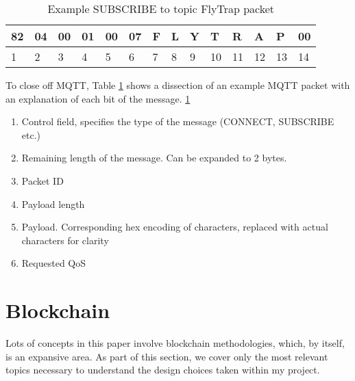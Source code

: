 \begin{table}[h]
\centering
\begin{tabular}{llllllllllllll}
\hline
\multicolumn{1}{|l|}{82} & \multicolumn{1}{l|}{04} & \multicolumn{1}{l|}{00} & \multicolumn{1}{l|}{01} & \multicolumn{1}{l|}{00} & \multicolumn{1}{l|}{07} & \multicolumn{1}{l|}{F} & \multicolumn{1}{l|}{L} & \multicolumn{1}{l|}{Y} & \multicolumn{1}{l|}{T} & \multicolumn{1}{l|}{R} & \multicolumn{1}{l|}{A} & \multicolumn{1}{l|}{P} & \multicolumn{1}{l|}{00} \\ \hline
1                        & 2                       & 3                       & 4                       & 5                       & 6                       & 7                      & 8                      & 9                      & 10                     & 11                     & 12                     & 13                     & 14                     
\end{tabular}
\caption{Example SUBSCRIBE to topic FlyTrap packet}
\label{tab:sub_packet}
\end{table}

To close off MQTT, Table \ref{tab:sub_packet} shows a dissection of an example MQTT packet with an explanation of each bit of the message. \ref{tab:sub_packet}
\begin{enumerate}
  \item [1] Control field, specifies the type of the message (CONNECT, SUBSCRIBE etc.)
  \item [2] Remaining length of the message. Can be expanded to 2 bytes.
  \item [3-4] Packet ID
  \item [5-6] Payload length
  \item [7-13] Payload. Corresponding hex encoding of characters, replaced with actual characters for clarity
  \item [14] Requested QoS
\end{enumerate}

\section{Blockchain}

Lots of concepts in this paper involve blockchain methodologies, which, by itself, is an expansive area. As part of this section, we cover only the most relevant topics necessary to understand the design choices taken within my project.

